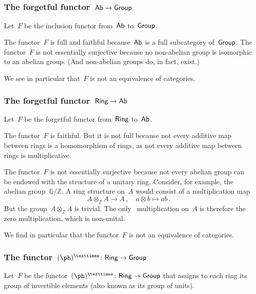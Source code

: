 \subsection{}



\subsubsection*{The forgetful functor~$\mathsf{Ab} \to \mathsf{Group}$}

Let~$F$ be the inclusion functor from~$\mathsf{Ab}$ to~$\mathsf{Group}$.

The functor~$F$ is full and faithful because~$\mathsf{Ab}$ is a full subcategory of~$\mathsf{Group}$.
The functor~$F$ is not essentially surjective because no non-abelian group is isomorphic to an abelian group.
(And non-abelian groups do, in fact, exist.)

We see in particular that~$F$ is not an equivalence of categories.



\subsubsection*{The forgetful functor~$\mathsf{Ring} \to \mathsf{Ab}$}

Let~$F$ be the forgetful functor from~$\mathsf{Ring}$ to~$\mathsf{Ab}$.

The functor~$F$ is faithful.
But it is not full because not every additive map between rings is a homomorphism of rings, as not every additive map between rings is multiplicative.

The functor~$F$ is not essentially surjective because not every abelian group can be endowed with the structure of a unitary ring.
Consider, for example, the abelian group~$ℚ / ℤ$.
A ring structure on~$A$ would consist of a multiplication map
\[
	A ⊗_ℤ A \to A \,,
	\quad
	a ⊗ b \mapsto ab \,.
\]
But the group~$A ⊗_ℤ A$ is trivial.
The only~ multiplication on~$A$ is therefore the zero multiplication, which is non-unital.

We find in particular that the functor~$F$ is not an equivalence of categories.



\subsubsection*{The functor~$(\ph)^× \colon \Ring \to \Group$}

Let~$F$ be the functor~$(\ph)^× \colon \Ring \to \Group$ that assigns to each ring its group of invertible elements (also known as its group of units).

